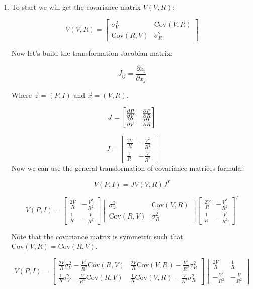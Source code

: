 \documentclass[10pt]{article}
\begin{document}
\begin{enumerate}[label=(\alph*)]
	\item To start we will get the covariance matrix $V(V,R)$:

	      \[ V(V,R) = \begin{bmatrix}
			      \sigma_V^2      & \text{Cov}(V,R) \\
			      \text{Cov}(R,V) & \sigma_R^2
		      \end{bmatrix} \]

	      Now let's build the transformation Jacobian matrix:

	      \[ J_{ij} = \frac{\partial z_i}{\partial x_j} \]

	      Where $\vec{z} = (P,I)$ and $\vec{x} = (V,R)$.

	      \[ J = \begin{bmatrix}
			      \pdv{P}{V} & \pdv{P}{R} \\
			      \pdv{I}{V} & \pdv{I}{R}
		      \end{bmatrix} \]

	      \[ J = \begin{bmatrix}
			      \frac{2V}{R} & -\frac{V^2}{R^2} \\
			      \frac{1}{R}  & -\frac{V}{R^2}
		      \end{bmatrix} \]
	      Now we can use the general transformation of covariance matrices formula:

	      \[ V(P,I) = J V(V,R) J^T \]

	      \[ V(P,I) = \begin{bmatrix}
			      \frac{2V}{R} & -\frac{V^2}{R^2} \\
			      \frac{1}{R}  & -\frac{V}{R^2}
		      \end{bmatrix}  \begin{bmatrix}
			      \sigma_V^2      & \text{Cov}(V,R) \\
			      \text{Cov}(R,V) & \sigma_R^2
		      \end{bmatrix} \begin{bmatrix}
			      \frac{2V}{R} & -\frac{V^2}{R^2} \\
			      \frac{1}{R}  & -\frac{V}{R^2}
		      \end{bmatrix}^T \]


	      Note that the covariance matrix is symmetric such that $\text{Cov}(V,R) = \text{Cov}(R,V) $.


	      \[ V(P,I) = \begin{bmatrix} \frac{2V}{R}\sigma_V^2 - \frac{V^2}{R^2}\text{Cov}(R,V) & \frac{2V}{R}\text{Cov}(V,R) - \frac{V^2}{R^2}\sigma_R^2 \\ \frac{1}{R}\sigma_V^2 - \frac{V}{R^2}\text{Cov}(R,V) & \frac{1}{R}\text{Cov}(V,R) - \frac{V}{R^2}\sigma_R^2 \end{bmatrix} \begin{bmatrix} \frac{2V}{R} & \frac{1}{R} \\ -\frac{V^2}{R^2} & -\frac{V}{R^2} \end{bmatrix} \]


\end{enumerate}
\end{document}
